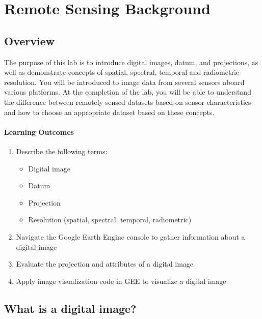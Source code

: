 \documentclass[
]{article}
\providecommand{\tightlist}{%
  \setlength{\itemsep}{0pt}\setlength{\parskip}{0pt}}
\begin{document}
\hypertarget{lab1}{%
\section{Remote Sensing Background}\label{lab1}}

\hypertarget{overview-1}{%
\subsection*{Overview}\label{overview-1}}

The purpose of this lab is to introduce digital images, datum, and projections, as well as demonstrate concepts of spatial, spectral, temporal and radiometric resolution. You will be introduced to image data from several sensors aboard various platforms. At the completion of the lab, you will be able to understand the difference between remotely sensed datasets based on sensor characteristics and how to choose an appropriate dataset based on these concepts.

\hypertarget{learning-outcomes-1}{%
\paragraph*{Learning Outcomes}\label{learning-outcomes-1}}

\begin{enumerate}
\def\labelenumi{\arabic{enumi}.}
\tightlist
\item
  Describe the following terms:

  \begin{itemize}
  \tightlist
  \item
    Digital image
  \item
    Datum
  \item
    Projection
  \item
    Resolution (spatial, spectral, temporal, radiometric)
  \end{itemize}
\item
  Navigate the Google Earth Engine console to gather information about a digital image
\item
  Evaluate the projection and attributes of a digital image
\item
  Apply image visualization code in GEE to visualize a digital image
\end{enumerate}

\hypertarget{what-is-a-digital-image}{%
\subsection{What is a digital image?}\label{what-is-a-digital-image}}
\end{document}
